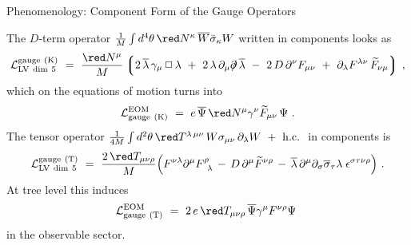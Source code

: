 \documentclass[pdf,PItalk,slideColor,colorBG,accumulate]{prosper}
\newcommand{\slashed}[1]{\hbox{{$#1$}\llap{$/$}}}
\begin{document}
{
\begin{slide}[Replace]{ Phenomenology: Component Form of the Gauge Operators }

	The $ D $-term operator 
$ \frac 1M \int d^4\theta \, 
{\red N^\kappa}\, \overline{W} \bar{\sigma}_\kappa W $
	written in components looks as 
\begin{equation*}
\mathcal{L}_{\mathrm{LV~dim~5}}^{\mathrm{gauge\ (K)}} 
 ~=~ \frac{\red N^\mu}{M}\,  
\Big\lgroup 
2\, \overline{\lambda}\,\gamma_\mu\, \Box\, 
   \lambda 
~+~
2\, \lambda\, \partial_\mu \slashed{\partial}\, 
   \overline{\lambda} 
~-~ 
2\, D\, \partial^\nu F_{\mu\nu}
~+~ 
\partial_\lambda F^{\lambda\nu}\, 
\widetilde{F}_{\nu\mu} 
\Big\rgroup~,
\end{equation*}
%
	which on the equations of motion turns into
\begin{equation*}
        \mathcal{L}_{\rm gauge\ (K)}^{\rm EOM} ~=~  
 e\, \overline{\Psi}\, {\red N^\mu} \gamma^\nu
\widetilde{F}_{\mu\nu}\, \Psi~.
\end{equation*}
%
	The tensor operator 
$ \frac 1{4M} 
\int d^2\theta \, {\red T^{\lambda\, \mu\nu}} \,
        W \sigma_{\mu\nu} \, \partial_\lambda W  
~+~ {\rm h.c.} ~$
	in components is
\begin{equation*}
\mathcal{L}_{\mathrm{LV~dim~5}}^{\mathrm{gauge\ (T)}}  
      ~  =~ 
\frac{2\,{\red T_{\mu\nu\rho}}}{M}
\Big( 
F^{\nu\lambda}\partial^\mu F^\rho_{\phantom{\rho}\lambda}
\,-\, D\, \partial^\mu \widetilde{F}^{\nu\rho} 
\,-\,\overline{\lambda}\, \partial^\mu \partial_\sigma
\overline{\sigma}_\tau \lambda\; \epsilon^{\sigma\tau\nu\rho}
\Big)~.
\end{equation*}
	At tree level this induces
\begin{eqnarray*}
        \mathcal{L}_{\rm gauge\ (T)}^{\rm EOM} ~=~   
        2\,e\,  {\red T_{\mu\nu\rho}} \, 
         \overline{\Psi} \gamma^\mu F^{\nu\rho} \Psi
        ~
\end{eqnarray*}
%
	in the observable sector.

\end{slide}
}

\end{document}
